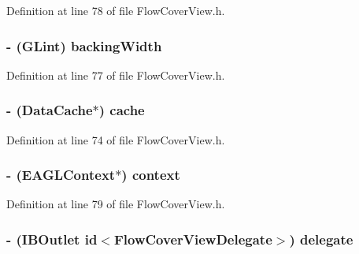 Definition at line 78 of file FlowCoverView.h.

\hypertarget{interface_flow_cover_view_acef316e43bd2cab027258e37efe3f1ce}{
\subsubsection[{backingWidth}]{\setlength{\rightskip}{0pt plus 5cm}-\/ (GLint) {\bf backingWidth}}}
\label{interface_flow_cover_view_acef316e43bd2cab027258e37efe3f1ce}


Definition at line 77 of file FlowCoverView.h.

\hypertarget{interface_flow_cover_view_ab4f53a1cd1e7112495a5d9db8eb780c8}{
\subsubsection[{cache}]{\setlength{\rightskip}{0pt plus 5cm}-\/ ({\bf DataCache}$\ast$) {\bf cache}}}
\label{interface_flow_cover_view_ab4f53a1cd1e7112495a5d9db8eb780c8}


Definition at line 74 of file FlowCoverView.h.

\hypertarget{interface_flow_cover_view_a65e9007d4e86c1deff1cdfeaf19556ff}{
\subsubsection[{context}]{\setlength{\rightskip}{0pt plus 5cm}-\/ (EAGLContext$\ast$) {\bf context}}}
\label{interface_flow_cover_view_a65e9007d4e86c1deff1cdfeaf19556ff}


Definition at line 79 of file FlowCoverView.h.

\hypertarget{interface_flow_cover_view_ad6e325e8aedd2961604d7099532f48e8}{
\subsubsection[{delegate}]{\setlength{\rightskip}{0pt plus 5cm}-\/ (IBOutlet id$<${\bf FlowCoverViewDelegate}$>$) {\bf delegate}}}
\label{interface_flow_cover_view_ad6e325e8aedd2961604d7099532f48e8}


